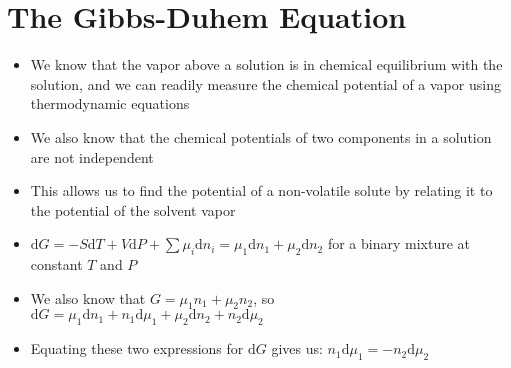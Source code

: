 \documentclass[12pt, openany, letterpaper]{memoir}
\begin{document}
\section*{The Gibbs-Duhem Equation}
\begin{itemize}
	\item We know that the vapor above a solution is in chemical equilibrium with the solution, and we can readily measure the chemical potential of a vapor using thermodynamic equations
	\item We also know that the chemical potentials of two components in a solution are not independent
	\item This allows us to find the potential of a non-volatile solute by relating it to the potential of the solvent vapor
	\item $\mathrm{d}G = -S\mathrm{d}T + V\mathrm{d}P + \sum \mu_i\mathrm{d}n_i = \mu_1\mathrm{d}n_1 + \mu_2\mathrm{d}n_2$ for a binary mixture at constant $T$ and $P$
	\item We also know that $G=\mu_1n_1 + \mu_2n_2$, so $\mathrm{d}G = \mu_1\mathrm{d}n_1 +n_1\mathrm{d}\mu_1 + \mu_2\mathrm{d}n_2 + n_2\mathrm{d}\mu_2$
	\item Equating these two expressions for $\mathrm{d}G$ gives us: $n_1\mathrm{d}\mu_1 = -n_2\mathrm{d}\mu_2$
\end{itemize}
\end{document}
